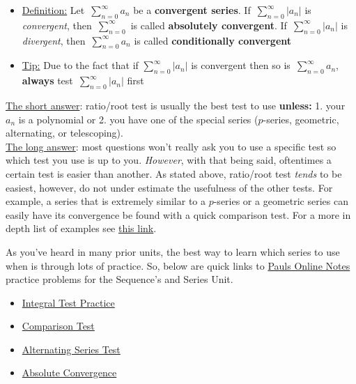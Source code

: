 \documentclass[addpoints]{exam}
\begin{document}
\begin{tcolorbox}[title=ABSOLUTE/CONDITIONAL CONVERGENCE, colback=white, colframe=green!75!black]
\begin{itemize}
    \item \underline{Definition:} Let $\displaystyle\,\sum_{n=0}^{\infty} a_n$ be a \textbf{convergent series}. If $\displaystyle\,\sum_{n=0}^{\infty} |a_n|$ is \textit{convergent}, then $\displaystyle\,\sum_{n=0}^{\infty}$ is called \textbf{absolutely convergent}. If $\displaystyle\,\sum_{n=0}^{\infty} |a_n|$ is \textit{divergent}, then $\displaystyle\,\sum_{n=0}^{\infty} a_n$ is called \textbf{conditionally convergent}
    \item \underline{Tip:} Due to the fact that if $\displaystyle\sum_{n=0}^{\infty} |a_n|$ is convergent then so is $\displaystyle\,\sum_{n=0}^{\infty} a_n$, \textbf{always} test $\displaystyle\,\sum_{n=0}^{\infty} |a_n|$ first
\end{itemize}
\end{tcolorbox}

\begin{tcolorbox}[title=WHEN TO USE EACH TEST, colback=white, colframe=red!75!white]
    \underline{The short answer}: ratio/root test is usually the best test to use \textbf{unless:} 1. your $a_n$ is a polynomial or 2. you have one of the special series ($p$-series, geometric, alternating, or telescoping). \\
    \underline{The long answer}: most questions won't really ask you to use a specific test so which test you use is up to you. \textit{However}, with that being said, oftentimes a certain test is easier than another. As stated above, ratio/root test \textit{tends} to be easiest, however, do not under estimate the usefulness of the other tests. For example, a series that is extremely similar to a $p$-series or a geometric series can easily have its convergence be found with a quick comparison test. For a more in depth list of examples see \href{https://tutorial.math.lamar.edu/Classes/CalcII/SeriesStrategy.aspx}{this link}. 
\end{tcolorbox}

\begin{tcolorbox}[title=PRACTICE, colback=white, colframe=blue!75!black]
    As you've heard in many prior units, the best way to learn which series to use when is through lots of practice. So, below are quick links to \href{https://tutorial.math.lamar.edu}{Pauls Online Notes} practice problems for the Sequence's and Series Unit. 
    \begin{itemize}
        \item \href{https://tutorial.math.lamar.edu/Problems/CalcII/IntegralTest.aspx}{Integral Test Practice}
        \item \href{https://tutorial.math.lamar.edu/Problems/CalcII/SeriesCompTest.aspx}{Comparison Test}
        \item \href{https://tutorial.math.lamar.edu/Problems/CalcII/AlternatingSeries.aspx}{Alternating Series Test}
        \item \href{https://tutorial.math.lamar.edu/Problems/CalcII/AbsoluteConvergence.aspx}{Absolute Convergence}
    \end{itemize}
\end{tcolorbox}
\end{document}
